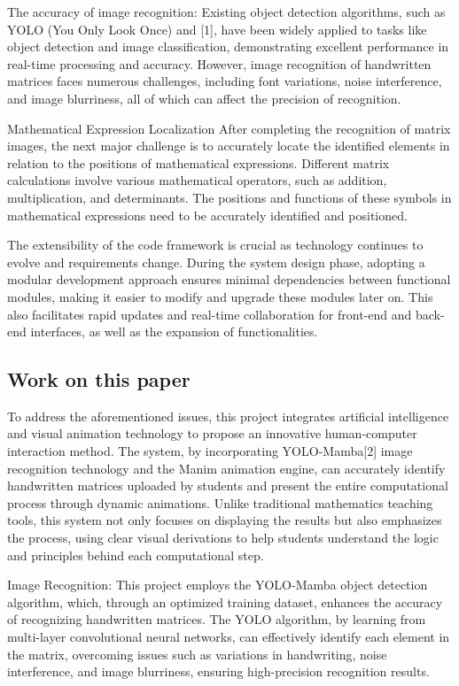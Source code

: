 \documentclass[
]{article}
\begin{document}
The accuracy of image recognition: Existing object detection algorithms,
such as YOLO (You Only Look Once) and {[}1{]}, have been widely applied
to tasks like object detection and image classification, demonstrating
excellent performance in real-time processing and accuracy. However,
image recognition of handwritten matrices faces numerous challenges,
including font variations, noise interference, and image blurriness, all
of which can affect the precision of recognition.

Mathematical Expression Localization After completing the recognition of
matrix images, the next major challenge is to accurately locate the
identified elements in relation to the positions of mathematical
expressions. Different matrix calculations involve various mathematical
operators, such as addition, multiplication, and determinants. The
positions and functions of these symbols in mathematical expressions
need to be accurately identified and positioned.

The extensibility of the code framework is crucial as technology
continues to evolve and requirements change. During the system design
phase, adopting a modular development approach ensures minimal
dependencies between functional modules, making it easier to modify and
upgrade these modules later on. This also facilitates rapid updates and
real-time collaboration for front-end and back-end interfaces, as well
as the expansion of functionalities.

\subsection{Work on this paper}\label{work-on-this-paper}

To address the aforementioned issues, this project integrates artificial
intelligence and visual animation technology to propose an innovative
human-computer interaction method. The system, by incorporating
YOLO-Mamba{[}2{]} image recognition technology and the Manim animation
engine, can accurately identify handwritten matrices uploaded by
students and present the entire computational process through dynamic
animations. Unlike traditional mathematics teaching tools, this system
not only focuses on displaying the results but also emphasizes the
process, using clear visual derivations to help students understand the
logic and principles behind each computational step.

Image Recognition: This project employs the YOLO-Mamba object detection
algorithm, which, through an optimized training dataset, enhances the
accuracy of recognizing handwritten matrices. The YOLO algorithm, by
learning from multi-layer convolutional neural networks, can effectively
identify each element in the matrix, overcoming issues such as
variations in handwriting, noise interference, and image blurriness,
ensuring high-precision recognition results.
\end{document}
